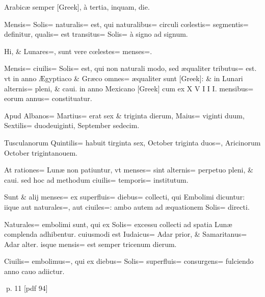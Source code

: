\begin{parnumbers}
Arabicæ semper [Greek], à tertia, inquam, die.

Mensis= Solis= naturalis= est, qui naturalibus= circuli cœlestis= segmentis= definitur, qualis= est transitus= Solis= à signo ad signum.

Hi, \& Lunares=, sunt vere cœlestes= menses=.

Mensis= ciuilis= Solis= est, qui non naturali modo, sed æqualiter tributus= est. vt in anno Ægyptiaco \& Græco omnes= æqualiter sunt [Greek]: \& in Lunari alternis= pleni, \& caui. in anno Mexicano [Greek] cum ex X V I I I. mensibus= eorum annus= constituatur.

Apud Albanos= Martius= erat sex \& triginta dierum, Maius= viginti duum, Sextilis= duodeuiginti, September sedecim.

Tusculanorum Quintilis= habuit tirginta sex, October triginta duos=, Aricinorum October trigintanouem.

At rationes= Lunæ non patiuntur, vt menses= sint alternis= perpetuo pleni, \& caui. sed hoc ad methodum ciuilis= temporis= institutum.

Sunt \& alij menses= ex superfluis= diebus= collecti, qui Embolimi dicuntur: iique aut naturales=, aut ciuiles=: ambo autem ad æquationem Solis= directi.

Naturales= embolimi sunt, qui ex Solis= excessu collecti ad spatia Lunæ complenda adhibentur. cuiusmodi est Iudaicus= Adar prior, \& Samaritanus= Adar alter. isque mensis= est semper tricenum dierum.

Ciuilis= embolimus=, qui ex diebus= Solis= superfluis= consurgens= fulciendo anno cauo adiictur.

\end{parnumbers}
\clearpage
p. 11 [pdf 94]

